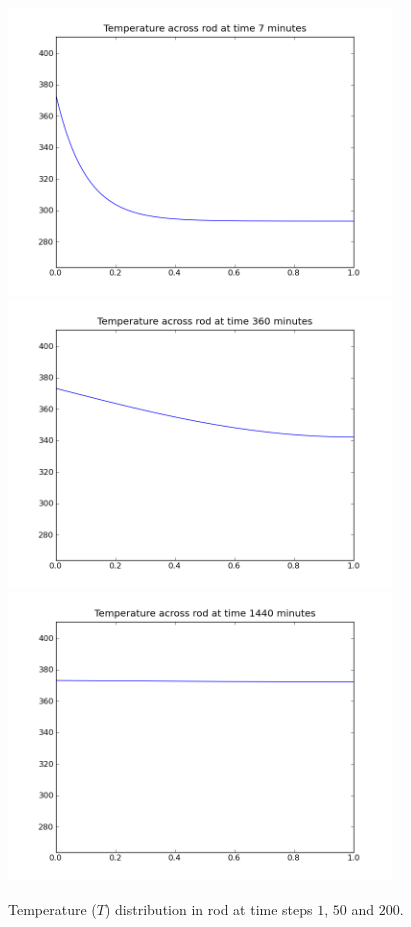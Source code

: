 \begin{figure}
\begin{center}
\includegraphics[width=4in]{figures/rodpyplot001}
\includegraphics[width=4in]{figures/rodpyplot050}
\includegraphics[width=4in]{figures/rodpyplot200}
\caption{Temperature ($T$) distribution in rod at time steps $1$, $50$ and $200$.}
\label{fig:onedheatout} 
\end{center}
\end{figure}

